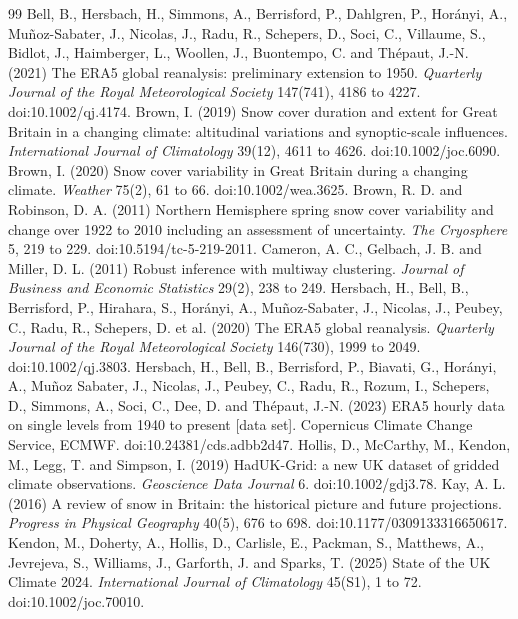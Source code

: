 \documentclass[11pt,a4paper]{article}
\begin{document}
\begin{thebibliography}{99}
 Bell, B., Hersbach, H., Simmons, A., Berrisford, P., Dahlgren, P., Horányi, A., Muñoz-Sabater, J., Nicolas, J., Radu, R., Schepers, D., Soci, C., Villaume, S., Bidlot, J., Haimberger, L., Woollen, J., Buontempo, C. and Thépaut, J.-N. (2021) The ERA5 global reanalysis: preliminary extension to 1950. \textit{Quarterly Journal of the Royal Meteorological Society} 147(741), 4186 to 4227. doi:10.1002/qj.4174.
 Brown, I. (2019) Snow cover duration and extent for Great Britain in a changing climate: altitudinal variations and synoptic-scale influences. \textit{International Journal of Climatology} 39(12), 4611 to 4626. doi:10.1002/joc.6090.
 Brown, I. (2020) Snow cover variability in Great Britain during a changing climate. \textit{Weather} 75(2), 61 to 66. doi:10.1002/wea.3625.
 Brown, R. D. and Robinson, D. A. (2011) Northern Hemisphere spring snow cover variability and change over 1922 to 2010 including an assessment of uncertainty. \textit{The Cryosphere} 5, 219 to 229. doi:10.5194/tc-5-219-2011.
 Cameron, A. C., Gelbach, J. B. and Miller, D. L. (2011) Robust inference with multiway clustering. \textit{Journal of Business and Economic Statistics} 29(2), 238 to 249.
 Hersbach, H., Bell, B., Berrisford, P., Hirahara, S., Horányi, A., Muñoz-Sabater, J., Nicolas, J., Peubey, C., Radu, R., Schepers, D. et al. (2020) The ERA5 global reanalysis. \textit{Quarterly Journal of the Royal Meteorological Society} 146(730), 1999 to 2049. doi:10.1002/qj.3803.
 Hersbach, H., Bell, B., Berrisford, P., Biavati, G., Horányi, A., Muñoz Sabater, J., Nicolas, J., Peubey, C., Radu, R., Rozum, I., Schepers, D., Simmons, A., Soci, C., Dee, D. and Thépaut, J.-N. (2023) ERA5 hourly data on single levels from 1940 to present [data set]. Copernicus Climate Change Service, ECMWF. doi:10.24381/cds.adbb2d47.
 Hollis, D., McCarthy, M., Kendon, M., Legg, T. and Simpson, I. (2019) HadUK-Grid: a new UK dataset of gridded climate observations. \textit{Geoscience Data Journal} 6. doi:10.1002/gdj3.78.
 Kay, A. L. (2016) A review of snow in Britain: the historical picture and future projections. \textit{Progress in Physical Geography} 40(5), 676 to 698. doi:10.1177/0309133316650617.
 Kendon, M., Doherty, A., Hollis, D., Carlisle, E., Packman, S., Matthews, A., Jevrejeva, S., Williams, J., Garforth, J. and Sparks, T. (2025) State of the UK Climate 2024. \textit{International Journal of Climatology} 45(S1), 1 to 72. doi:10.1002/joc.70010.

\end{thebibliography}
\end{document}
